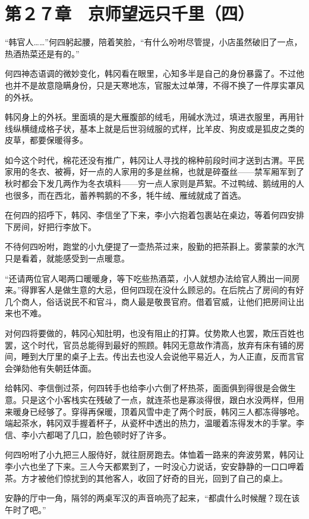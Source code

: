 \section{第２７章　京师望远只千里（四）}

“韩官人……”何四躬起腰，陪着笑脸，“有什么吩咐尽管提，小店虽然破旧了一点，热酒热菜还是有的。”

何四神态语调的微妙变化，韩冈看在眼里，心知多半是自己的身份暴露了。不过他也并不是故意隐瞒身份，只是天寒地冻，官服太过单薄，不得不换了一件厚实罩风的外袄。

韩冈身上的外袄。里面填的是大雁腹部的绒毛，用碱水洗过，填进衣服里，再用针线纵横缝成格子状，基本上就是后世羽绒服的式样，比羊皮、狗皮或是狐皮之类的皮草，都要保暖得多。

如今这个时代，棉花还没有推广，韩冈让人寻找的棉种前段时间才送到古渭。平民家用的冬衣、被褥，好一点的人家用的多是丝棉，也就是碎蚕丝——禁军厢军到了秋时都会下发几两作为冬衣填料——穷一点人家则是芦絮。不过鸭绒、鹅绒用的人也很多，而在西北，蓄养鸭鹅的不多，牦牛绒、雁绒就成了首选。

在何四的招呼下，韩冈、李信坐了下来，李小六抱着包裹站在桌边，等着何四安排下房间，好把行李放下。

不待何四吩咐，跑堂的小九便提了一壶热茶过来，殷勤的把茶斟上。雾蒙蒙的水汽只是看着，就能感受到一点暖意。

“还请两位官人喝两口暖暖身，等下吃些热酒菜，小人就想办法给官人腾出一间房来。”得罪客人是做生意的大忌，但何四现在没什么顾忌的。在后院占了房间的有好几个商人，俗话说民不和官斗，商人最是敬畏官府。借着官威，让他们把房间让出来也不难。

对何四将要做的，韩冈心知肚明，也没有阻止的打算。仗势欺人也罢，欺压百姓也罢，这个时代，官员总能得到最好的照顾。韩冈无意故作清高，放弃有床有铺的房间，睡到大厅里的桌子上去。传出去也没人会说他平易近人，为人正直，反而言官会弹劾他有失朝廷体面。

给韩冈、李信倒过茶，何四转手也给李小六倒了杯热茶，面面俱到得很是会做生意。只是这个小客栈实在残破了一点，就连茶也是寡淡得很，跟白水没两样，但用来暖身已经够了。穿得再保暖，顶着风雪中走了两个时辰，韩冈三人都冻得够呛。端起茶水，韩冈双手握着杯子，从瓷杯中透出的热力，温暖着冻得发木的手掌。李信、李小六都喝了几口，脸色顿时好了许多。

何四吩咐了小九把三人服侍好，就往厨房跑去。体恤着一路来的奔波劳累，韩冈让李小六也坐了下来。三人今天都累到了，一时没心力说话，安安静静的一口口呷着茶。方才被他们惊扰到的其他客人，收回了好奇的目光，回到了自己的桌上。

安静的厅中一角，隔邻的两桌军汉的声音响亮了起来，“都虞什么时候醒？现在该午时了吧。”

